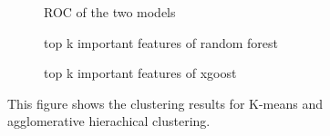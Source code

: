 \begin{figure}[!htbp] %
  \centering %

  \begin{subfigure}{0.3\textwidth} %
    \centering
    \fbox{\rule[-.5cm]{0cm}{3cm} \rule[-.5cm]{3cm}{0cm}} %
    \caption{ROC of the two models} %
    \label{fig:subA_1x2} %
  \end{subfigure}\hfill %
  \begin{subfigure}{0.3\textwidth} %
    \centering
    \fbox{\rule[-.5cm]{0cm}{3cm} \rule[-.5cm]{3cm}{0cm}} %
    \caption{top k important features of random forest} %
    \label{fig:subA_1x2} %
  \end{subfigure}\hfill %
  \begin{subfigure}{0.3\textwidth} %
    \centering
    \fbox{\rule[-.5cm]{0cm}{3cm} \rule[-.5cm]{3cm}{0cm}} %
    \caption{top k important features of xgoost} %
    \label{fig:subB_1x2} %
  \end{subfigure}

  \caption{This figure shows the clustering results for K-means and agglomerative hierachical clustering.} %
  \label{fig:main_figure_1x2_grid} %
\end{figure}